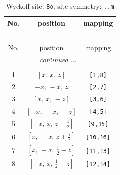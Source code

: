 \documentclass[fleqn,8pt]{jsarticle}
\begin{document}
\begin{longtable}{ccc}
\caption{Wyckoff site: {\tt 8o}, site symmetry: {\tt ..m}}
 \\
 \hline \hline
No. & position & mapping \\ \hline \endfirsthead

\multicolumn{2}{l}{\tablename\ \thetable{}} \\
 \hline \hline
No. & position & mapping \\ \hline \endhead

 \hline \hline
\multicolumn{2}{r}{\footnotesize\it continued ...} \\ \endfoot

 \hline \hline
\multicolumn{2}{r}{} \\ \endlastfoot

1 & $\left[ x,\, x,\, z \right]$ & {\tt [1,8]} \\ \hline
2 & $\left[ - x,\, - x,\, z \right]$ & {\tt [2,7]} \\ \hline
3 & $\left[ x,\, x,\, - z \right]$ & {\tt [3,6]} \\ \hline
4 & $\left[ - x,\, - x,\, - z \right]$ & {\tt [4,5]} \\ \hline
5 & $\left[ - x,\, x,\, z + \frac{1}{2} \right]$ & {\tt [9,15]} \\ \hline
6 & $\left[ x,\, - x,\, z + \frac{1}{2} \right]$ & {\tt [10,16]} \\ \hline
7 & $\left[ x,\, - x,\, \frac{1}{2} - z \right]$ & {\tt [11,13]} \\ \hline
8 & $\left[ - x,\, x,\, \frac{1}{2} - z \right]$ & {\tt [12,14]} \\
\end{longtable}
\renewcommand{\arraystretch}{1.2}
\end{document}
